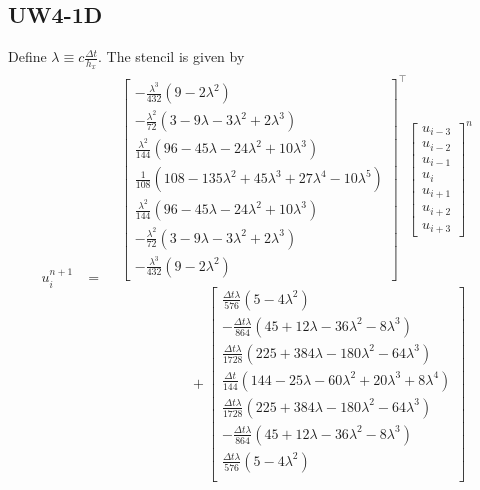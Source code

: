 \documentclass[12pt]{article}
\begin{document}
\subsection{UW4-1D}
Define $\lambda \equiv c \tfrac{\Delta t}{h_x}$.
The stencil \cite[eqn. (74), (73), \& app. A.1]{Banks2012} is given by
\begin{align}
u_{i}^{n+1} &= 
\begin{aligned}
&
\begin{bmatrix}
-\tfrac{\lambda^3}{432}(9 -2 \lambda^2) \\
-\tfrac{\lambda^2}{72} (3 - 9 \lambda - 3 \lambda^2 + 2 \lambda^3) \\
\tfrac{\lambda^2}{144} (96 - 45 \lambda - 24 \lambda^2 + 10 \lambda^3) \\
\tfrac{1}{108} (108 - 135 \lambda^2 +45 \lambda^3 + 27 \lambda^4 -10 \lambda^5) \\  
\tfrac{\lambda^2}{144} (96 - 45 \lambda - 24 \lambda^2 + 10 \lambda^3) \\
-\tfrac{\lambda^2}{72} (3 - 9 \lambda - 3 \lambda^2 + 2 \lambda^3) \\
-\tfrac{\lambda^3}{432}(9 -2 \lambda^2)
\end{bmatrix}^\top
\begin{bmatrix}
u_{i-3} \\
u_{i-2} \\
u_{i-1} \\
u_i  \\
u_{i+1} \\
u_{i+2} \\
u_{i+3}
\end{bmatrix}^n 
\\
&\quad \quad \quad \quad \quad+ 
\begin{bmatrix}
\tfrac{\Delta t \lambda}{576}(5 - 4 \lambda^2) \\
-\tfrac{\Delta t \lambda}{864} (45 + 12 \lambda - 36 \lambda^2 - 8 \lambda^3) \\
\tfrac{\Delta t \lambda}{1728} (225 + 384 \lambda - 180 \lambda^2 - 64 \lambda^3) \\
\tfrac{\Delta t }{144} (144 - 25 \lambda - 60 \lambda^2 + 20 \lambda^3 + 8  \lambda^4) \\  
\tfrac{\Delta t \lambda}{1728} (225 + 384 \lambda - 180 \lambda^2 - 64 \lambda^3) \\
-\tfrac{\Delta t \lambda}{864} (45 + 12 \lambda - 36 \lambda^2 - 8 \lambda^3) \\
\tfrac{\Delta t \lambda}{576}(5 - 4 \lambda^2) \\

\end{bmatrix}
\end{aligned}
\end{align}
\end{document}
